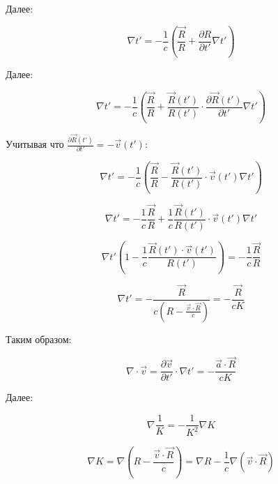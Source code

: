 \documentclass[12pt, a4paper]{article}
\begin{document}
Далее:

\begin{equation}
\nabla t' = -\frac{1}{c} \left( \frac{\vec{R}}{R} + \frac{\partial R}{\partial t'} \nabla t' \right)
\label{eq:grad_t_expanded}
\end{equation}

Далее:

\begin{equation}
\nabla t' = -\frac{1}{c} \left( \frac{\vec{R}}{R} + \frac{\vec{R}(t')}{R(t')} \cdot \frac{\partial \vec{R}(t')}{\partial t'} \nabla t' \right)
\label{eq:grad_t_expanded2}
\end{equation}

Учитывая что $\frac{\partial \vec{R}(t')}{\partial t'} = -\vec{v}(t')$:

\begin{equation}
\nabla t' = -\frac{1}{c} \left( \frac{\vec{R}}{R} - \frac{\vec{R}(t')}{R(t')} \cdot \vec{v}(t') \nabla t' \right)
\label{eq:grad_t_expanded3}
\end{equation}

\begin{equation}
\nabla t' = -\frac{1}{c} \frac{\vec{R}}{R} + \frac{1}{c} \frac{\vec{R}(t')}{R(t')} \cdot \vec{v}(t') \nabla t'
\label{eq:grad_t_expanded4}
\end{equation}

\begin{equation}
\nabla t' \left( 1 - \frac{1}{c} \frac{\vec{R}(t') \cdot \vec{v}(t')}{R(t')} \right) = -\frac{1}{c} \frac{\vec{R}}{R}
\label{eq:grad_t_expanded5}
\end{equation}

\begin{equation}
\nabla t' = -\frac{\vec{R}}{c \left( R - \frac{\vec{v} \cdot \vec{R}}{c} \right)} = -\frac{\vec{R}}{cK}
\label{eq:grad_t_final}
\end{equation}

Таким образом:

\begin{equation}
\nabla \cdot \vec{v} = \frac{\partial \vec{v}}{\partial t'} \cdot \nabla t' = -\frac{\vec{a} \cdot \vec{R}}{cK}
\label{eq:div_v}
\end{equation}

Далее:

\begin{equation}
\nabla \frac{1}{K} = -\frac{1}{K^2} \nabla K
\label{eq:grad_1_K}
\end{equation}

\begin{equation}
\nabla K = \nabla \left( R - \frac{\vec{v} \cdot \vec{R}}{c} \right) = \nabla R - \frac{1}{c} \nabla (\vec{v} \cdot \vec{R})
\label{eq:grad_K}
\end{equation}
\end{document}
